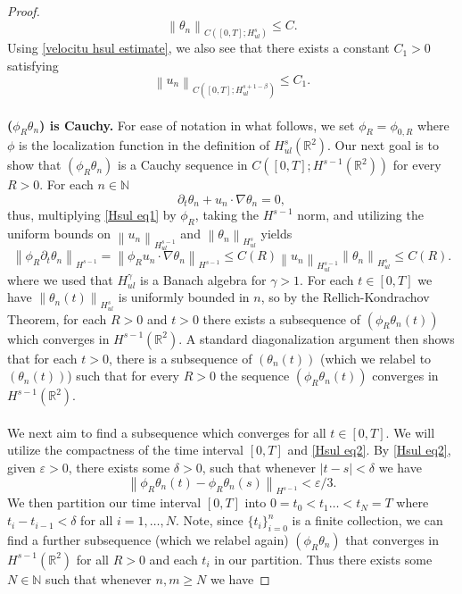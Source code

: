 \documentclass[12pt,xcolor=svgnames]{amsart}
\newcommand{\R}{\mathbb{R}}
\newcommand{\eps}{\varepsilon}
\newcommand{\abs}[1]{\mid\!#1\!\mid}
\newcommand{\norm}[2]{\left\lVert#1\right\rVert_{#2}}
\begin{document}
\begin{proof}
$$
\norm{\theta_n}{C([0,T];H_{ul}^s)}\leq C.
$$
Using \eqref{velocitu hsul estimate}, we also see that there exists a constant $C_1>0$ satisfying
$$
\norm{u_n}{C([0,T];H_{ul}^{s+1-\beta})} \leq C_1.
$$
\\
\textbf{($\phi_R\theta_n$) is Cauchy.}
For ease of notation in what follows, we set $\phi_R=\phi_{0,R}$ where $\phi$ is the localization function in the definition of $H_{ul}^s(\R^2)$. Our next goal is to show that $(\phi_R\theta_n)$ is a Cauchy sequence in $C([0,T];H^{s-1}(\R^2))$ for every $R>0$. For each $n \in \mathbb{N}$
\begin{equation}
\label{Hsul eq1}
\partial_t\theta_n+u_n\cdot \nabla \theta_n=0,
\end{equation}
thus, multiplying \eqref{Hsul eq1} by $\phi_R$, taking the $H^{s-1}$ norm, and utilizing the uniform bounds on $\norm{u_n}{H_{ul}^{s-1}}$ and $\norm{\theta_n}{H_{ul}^s}$ yields
\begin{equation}
\label{Hsul eq2}
\norm{\phi_R\partial_t\theta_n}{H^{s-1}} = \norm{\phi_Ru_n\cdot \nabla \theta_n}{H^{s-1}} \leq C(R)\norm{u_n}{H_{ul}^{s-1}}\norm{\theta_n}{H_{ul}^s} \leq C(R).
\end{equation}
where we used that $H^{\gamma}_{ul}$ is a Banach algebra for $\gamma>1$.
For each $t \in [0,T]$ we have $\norm{\theta_n(t)}{H_{ul}^s}$ is uniformly bounded in $n$, so by the Rellich-Kondrachov Theorem, for each $R>0$ and $t>0$ there exists a subsequence of $(\phi_R\theta_n(t))$ which converges in $H^{s-1}(\R^2)$. A standard diagonalization argument then shows that for each $t>0$, there is a subsequence of $(\theta_n(t))$ (which we relabel to $(\theta_n(t))$) such that for every $R>0$ the sequence $(\phi_R\theta_n(t))$ converges in $H^{s-1}(\R^2)$.
\\
\\
We next aim to find a subsequence which converges for all $t\in [0,T]$. We will utilize the compactness of the time interval $[0,T]$ and \eqref{Hsul eq2}. By \eqref{Hsul eq2}, given $\eps>0$, there exists some $\delta>0$, such that whenever $\abs{t-s}<\delta$ we have 
\begin{equation}
\label{Hsul eq3}
\norm{\phi_R\theta_n(t)-\phi_R\theta_n(s)}{H^{s-1}}< \eps/3.
\end{equation}
We then partition our time interval $[0,T]$ into $0=t_0<t_1\hdots<t_N=T$ where $t_i-t_{i-1}<\delta$ for all $i=1,\hdots,N$. Note, since $\{t_i\}_{i=0}^n$ is a finite collection, we can find a further subsequence (which we relabel again) $(\phi_R\theta_n)$ that converges in $H^{s-1}(\R^2)$ for all $R>0$ and each $t_i$ in our partition. Thus there exists some $N \in \mathbb{N}$ such that whenever $n,m \geq N$ we have 

\end{proof}
\end{document}
